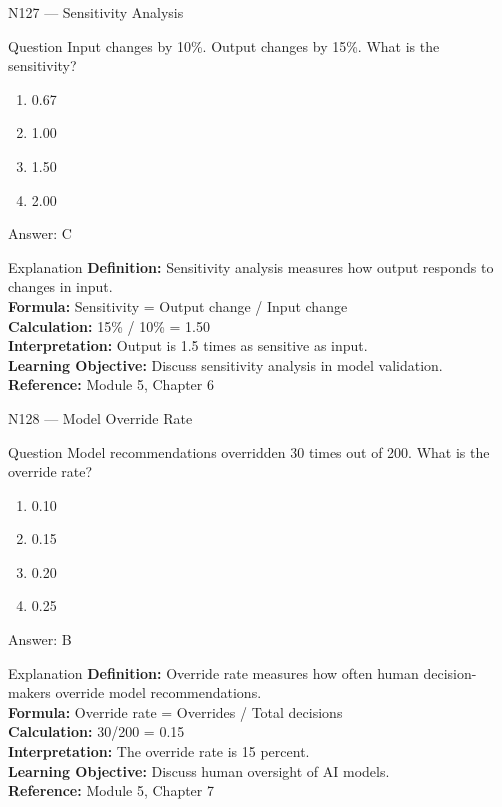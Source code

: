 \documentclass[aspectratio=169,8pt]{beamer}
\begin{document}
	\begin{frame}{N127 --- Sensitivity Analysis}
		\begin{block}{Question}
			Input changes by 10\%. Output changes by 15\%. What is the sensitivity?
			\begin{enumerate}
				\item 0.67
				\item 1.00
				\item 1.50
				\item 2.00
			\end{enumerate}
		\end{block}
		\begin{exampleblock}{Answer: C}\end{exampleblock}
		\begin{block}{Explanation}
			\textbf{Definition:} Sensitivity analysis measures how output responds to changes in input.\\
			\textbf{Formula:} Sensitivity = Output change / Input change\\
			\textbf{Calculation:} 15\% / 10\% = 1.50\\
			\textbf{Interpretation:} Output is 1.5 times as sensitive as input.\\
			\textbf{Learning Objective:} Discuss sensitivity analysis in model validation.\\
			\textbf{Reference:} Module 5, Chapter 6
		\end{block}
	\end{frame}
	
	\begin{frame}{N128 --- Model Override Rate}
		\begin{block}{Question}
			Model recommendations overridden 30 times out of 200. What is the override rate?
			\begin{enumerate}
				\item 0.10
				\item 0.15
				\item 0.20
				\item 0.25
			\end{enumerate}
		\end{block}
		\begin{exampleblock}{Answer: B}\end{exampleblock}
		\begin{block}{Explanation}
			\textbf{Definition:} Override rate measures how often human decision-makers override model recommendations.\\
			\textbf{Formula:} Override rate = Overrides / Total decisions\\
			\textbf{Calculation:} 30/200 = 0.15\\
			\textbf{Interpretation:} The override rate is 15 percent.\\
			\textbf{Learning Objective:} Discuss human oversight of AI models.\\
			\textbf{Reference:} Module 5, Chapter 7
		\end{block}
	\end{frame}
	
\end{document}
